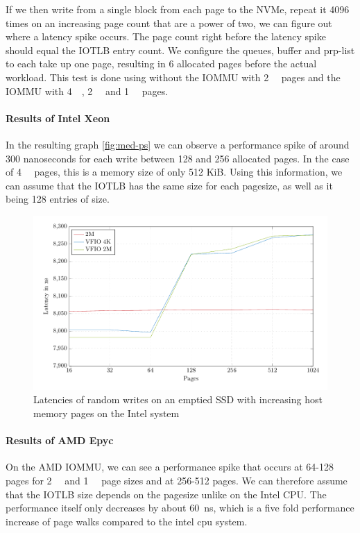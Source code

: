 If we then write from a single block from each page to the NVMe, repeat it 4096 times on an increasing page count that are a power of two, we can figure out where a latency spike occurs. The page count right before the latency spike should equal the IOTLB entry count. We configure the queues, buffer and prp-list to each take up one page, resulting in 6 allocated pages before the actual workload. This test is done using without the IOMMU with \qty{2}{\mebi\byte} pages and the IOMMU with \qty{4}{\kibi\byte}, \qty{2}{\mebi\byte} and \qty{1}{\gibi\byte} pages.

\paragraph{Results of Intel Xeon}

In the resulting graph \autoref{fig:med-ps} we can observe a performance spike of around 300 nanoseconds for each write between 128 and 256 allocated pages. In the case of \qty{4}{\kibi\byte} pages, this is a memory size of only 512 KiB. Using this information, we can assume that the IOTLB has the same size for each pagesize, as well as it being 128 entries of size.

\begin{figure}[H]
  \centering
  \includegraphics[width=\textwidth]{figures/psmeds}
  \caption{Latencies of random writes on an emptied SSD with increasing host memory pages on the Intel system}
  \label{fig:med-ps}
\end{figure}

\paragraph{Results of AMD Epyc}
On the AMD IOMMU, we can see a performance spike that occurs at 64-128 pages for \qty{2}{\mebi\byte} and \qty{1}{\gibi\byte} page sizes and at 256-512 pages. We can therefore assume that the IOTLB size depends on the pagesize unlike on the Intel CPU. The performance itself only decreases by about \qty{60}{ns}, which is a five fold performance increase of page walks compared to the intel cpu system.

